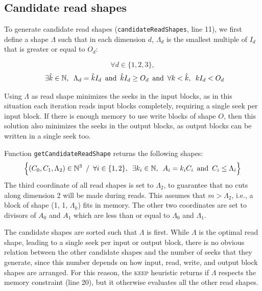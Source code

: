 \documentclass[sigconf, nonacm]{acmart}
\newcommand{\keep}[0]{\textsc{keep}\xspace}
\begin{document}
\subsection{Candidate read shapes}


To generate candidate read shapes (\texttt{candidateReadShapes}, line 11), we first define a shape $\Lambda$ such
that in each dimension $d$, $\Lambda_d$ is the smallest multiple of $I_d$
that is greater or equal to $O_d$:

\[
\forall d \in \{1, 2, 3\},
\]
\[
  \enskip \exists \hat k \in \mathbb{N}, \enskip \Lambda_d = \hat kI_d \enskip \mathrm{and} \enskip \hat k I_d \geq O_d \enskip \mathrm{and} \enskip \forall k < \hat k, \enskip kI_d < O_d
\]

Using $\Lambda$ as read shape minimizes the seeks in the input blocks, as
in this situation each iteration reads input blocks completely, requiring a
single seek per input block. If there is enough memory to use write blocks
of shape $O$, then this solution also minimizes the seeks in the output
blocks, as output blocks can be written in a single seek too.

Function \texttt{getCandidateReadShape} returns the following shapes:
\[
  \Big\{ (C_0, C_1, \Lambda_2) \in \mathbb{N}^3 \enskip / \enskip
          \forall i \in \{1, 2\}, \enskip \exists k_i \in \mathbb{N}, \enskip
           A_i = k_iC_i \enskip \mathrm{and} \enskip C_i \leq \Lambda_i \Big\}
\]
The third coordinate of all read shapes is set to $\Lambda_2$, to guarantee
that no cuts along dimension 2 will be made during reads. This assumes that
$m > \Lambda_2$, i.e., a block of shape (1, 1, $\Lambda_k$) fits in
memory. The other two coordinates are set to divisors of $A_0$ and $A_1$ which are
less than or equal to $\Lambda_0$ and $\Lambda_1$. 

The candidate shapes are sorted such that $\Lambda$ is first.
While $\Lambda$ is the optimal read shape, leading to a single seek per
input or output block, there is no obvious relation between the other
candidate shapes and the number of seeks that they generate, since this
number depends on how input, read, write, and output block shapes are
arranged. For this reason, the \keep heuristic returns if $\Lambda$ respects 
the memory constraint (line 20), but it otherwise evaluates all the other read shapes.
\end{document}
